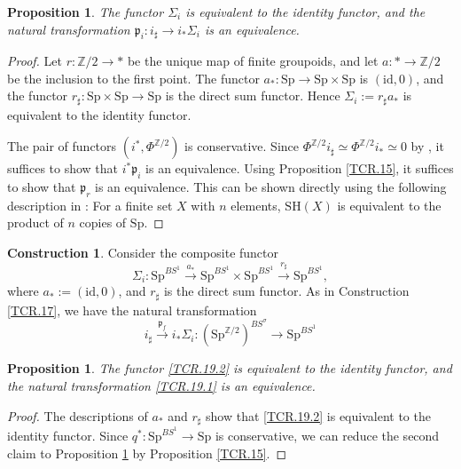 \documentclass[10pt]{amsart}
\newtheorem{prop}[thm]{Proposition}
\theoremstyle{definition}
\newtheorem{const}[thm]{Construction}
\theoremstyle{remark}
\numberwithin{equation}{section}
\newcommand{\Z}{\mathbb{Z}}
\newcommand{\id}{\mathrm{id}}
\newcommand{\Sp}{\mathrm{Sp}}
\newcommand{\SH}{\mathrm{SH}}
\begin{document}
\begin{prop}
\label{TCR.18}
The functor $\Sigma_i$ is equivalent to the identity functor,
and the natural transformation $\mathfrak{p}_i\colon i_\sharp \to i_*\Sigma_i$ is an equivalence.
\end{prop}
\begin{proof}
Let $r\colon \Z/2\to *$ be the unique map of finite groupoids,
and let $a\colon *\to \Z/2$ be the inclusion to the first point.
The functor $a_*\colon \Sp\to \Sp\times \Sp$ is $(\id,0)$,
and the functor $r_\sharp \colon \Sp\times \Sp\to \Sp$ is the direct sum functor.
Hence $\Sigma_i:=r_\sharp a_*$ is equivalent to the identity functor.

The pair of functors $(i^*,\Phi^{\Z/2})$ is conservative.
Since $\Phi^{\Z/2}i_\sharp \simeq \Phi^{\Z/2}i_*\simeq 0$ by \cite[Proposition A.2.7(3),(5)]{THR},
it suffices to show that $i^*\mathfrak{p}_i$ is an equivalence.
Using Proposition \ref{TCR.15},
it suffices to show that $\mathfrak{p}_r$ is an equivalence.
This can be shown directly using the following description in \cite[Proposition A.1.5]{THR}:
For a finite set $X$ with $n$ elements, $\SH(X)$ is equivalent to the product of $n$ copies of $\Sp$.
\end{proof}

\begin{const}
\label{TCR.19}
Consider the composite functor
\begin{equation}
\label{TCR.19.2}
\Sigma_i\colon \Sp^{BS^1} \xrightarrow{a_*} \Sp^{BS^1} \times \Sp^{BS^1} \xrightarrow{r_\sharp} \Sp^{BS^1},
\end{equation}
where $a_*:=(\id,0)$, and $r_\sharp$ is the direct sum functor.
As in Construction \ref{TCR.17},
we have the natural transformation
\begin{equation}
\label{TCR.19.1}
i_\sharp \xrightarrow{\mathfrak{p}_f} i_* \Sigma_i
\colon
(\Sp^{\Z/2})^{BS^\sigma}
\to
\Sp^{BS^1}
\end{equation}
\end{const}

\begin{prop}
\label{TCR.20}
The functor \eqref{TCR.19.2} is equivalent to the identity functor,
and the natural transformation \eqref{TCR.19.1} is an equivalence.
\end{prop}
\begin{proof}
The descriptions of $a_*$ and $r_\sharp$ show that \eqref{TCR.19.2} is equivalent to the identity functor.
Since $q^*\colon \Sp^{BS^1}\to \Sp$ is conservative,
we can reduce the second claim to Proposition \ref{TCR.18} by Proposition \ref{TCR.15}.
\end{proof}
\end{document}
